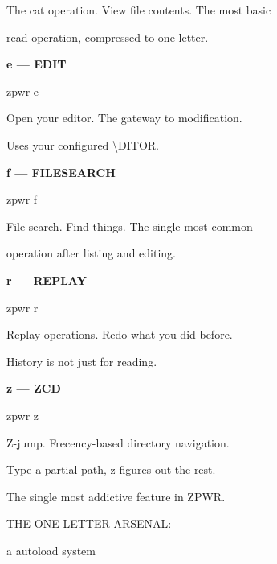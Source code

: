 \documentclass[11pt,a4paper,twoside]{book}
\begin{document}
The cat operation. View file contents. The most basic

read operation, compressed to one letter.


\vspace{12pt}
{\bfseries\color{neonyellow} e — EDIT}\vspace{4pt}

\begin{codebox}
zpwr e\\
\end{codebox}

Open your editor. The gateway to modification.

Uses your configured \textbackslash{}DITOR.


\vspace{12pt}
{\bfseries\color{neonyellow} f — FILESEARCH}\vspace{4pt}

\begin{codebox}
zpwr f\\
\end{codebox}

File search. Find things. The single most common

operation after listing and editing.


\vspace{12pt}
{\bfseries\color{neonyellow} r — REPLAY}\vspace{4pt}

\begin{codebox}
zpwr r\\
\end{codebox}

Replay operations. Redo what you did before.

History is not just for reading.


\vspace{12pt}
{\bfseries\color{neonyellow} z — ZCD}\vspace{4pt}

\begin{codebox}
zpwr z\\
\end{codebox}

Z-jump. Frecency-based directory navigation.

Type a partial path, z figures out the rest.

The single most addictive feature in ZPWR.

THE ONE-LETTER ARSENAL:

a   autoload system
\end{document}
